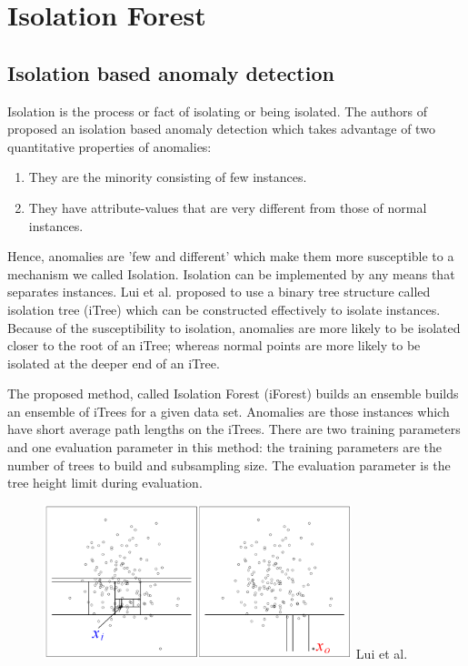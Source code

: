 \chapter{Isolation Forest}
\label{ch:isolation-forest}

\section{Isolation based anomaly detection}
\label{sec:isolation-based-anomaly-detection}

Isolation is the process or fact of isolating or being isolated.
The authors of \cite{10.1145/2133360.2133363} proposed an isolation based anomaly detection which takes advantage of two quantitative properties of anomalies:
\begin{enumerate}
    \item They are the minority consisting of few instances.
    \item They have attribute-values that are very different from those of normal instances.
\end{enumerate}

Hence, anomalies are 'few and different' which make them more susceptible to a mechanism we called Isolation.
Isolation can be implemented by any means that separates instances.
Lui et al. \cite{10.1145/2133360.2133363} proposed to use a binary tree structure called isolation tree (iTree) which can be constructed effectively to isolate instances.
Because of the susceptibility to isolation, anomalies are more likely to be isolated closer to the root of an iTree;
whereas normal points are more likely to be isolated at the deeper end of an iTree.

The proposed method, called Isolation Forest (iForest) builds an ensemble  builds an ensemble of iTrees for a given data set.
Anomalies are those instances which have short average path lengths on the iTrees.
There are two training parameters and one evaluation parameter in this method: the training parameters are the number of trees to build and subsampling size.
The evaluation parameter is the tree height limit during evaluation.

\vspace{1em}
\begin{figure}[!ht]
    \label{fig:isolating-a-point}
    \centering
    \includegraphics[width=0.80\textwidth]{../fig/chapter2/isolating-a-point.png}
    {Lui et al. \cite{10.1145/2133360.2133363}}
\end{figure}


